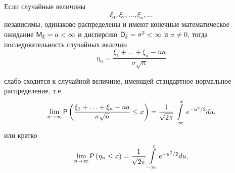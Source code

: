 \begin{theorem}
Если случайные величины $$\xi_1 , \xi_2 , \ldots , \xi_n , \ldots$$ независимы, одинаково распределены и имеют конечные математическое ожидание $\M_{\xi} = a < \infty$ и дисперсию $\D_{\xi} = \sigma^2 < \infty$ и $\sigma \ne 0$, тогда последовательность случайных величин
$$
\eta_n =
\frac{
	\xi_1 + \ldots + \xi_n - na
}{\sigma\sqrt{ n}}
$$

слабо сходится к случайной величине, имеющей стандартное нормальное распределение, т.е.
$$
\lim\limits_{n\to\infty}
\P\left(
	\frac{
		\xi_1 + \ldots + \xi_n - na
	}{\sigma\sqrt{ n}}\leq x
\right)
=\frac{1}{\sqrt{2\pi}}\int\limits_{-\infty}^x e^{-u^2/2} du,
$$
или кратко
$$
\lim\limits_{n\to\infty}
\P\left(
	\eta_n \leq x
\right)
=\frac{1}{\sqrt{2\pi}}\int\limits_{-\infty}^x e^{-u^2/2} du,
$$
\end{theorem}
